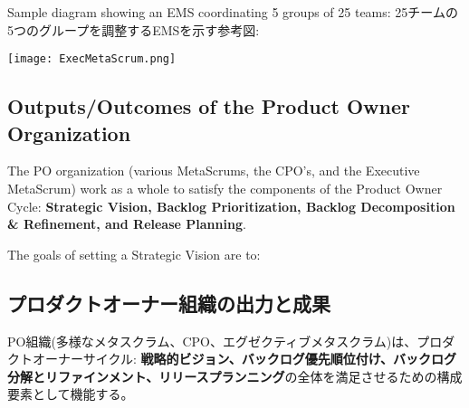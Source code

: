 \documentclass[12pt,a4paper,parskip=full]{scrartcl}
\begin{document}
Sample diagram showing an EMS coordinating 5 groups of 25 teams:
\fi
25チームの5つのグループを調整するEMSを示す参考図:

\texttt{[image: ExecMetaScrum.png]}

\subsection{Outputs/Outcomes of the Product Owner Organization}
The PO organization (various MetaScrums, the CPO's, and the Executive
MetaScrum) work as a whole to satisfy the components of the Product Owner
Cycle: \textbf{Strategic Vision, Backlog Prioritization, Backlog
Decomposition \& Refinement, and Release Planning}.

The goals of setting a Strategic Vision are to:
\fi
\subsection{プロダクトオーナー組織の出力と成果}
PO組織(多様なメタスクラム、CPO、エグゼクティブメタスクラム)は、プロダクトオーナーサイクル:
\textbf{戦略的ビジョン、バックログ優先順位付け、バックログ分解とリファインメント、リリースプランニング}の全体を満足させるための構成要素として機能する。
\end{document}
